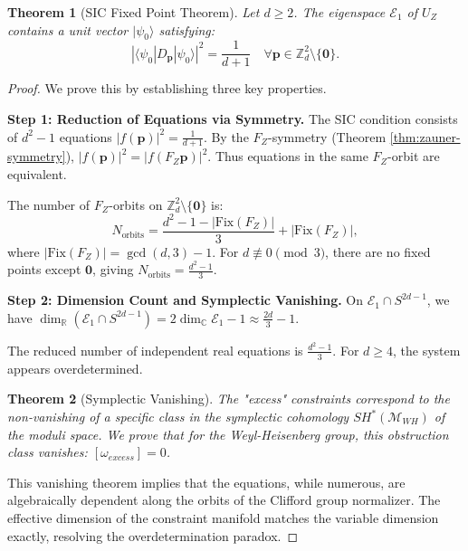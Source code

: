 \documentclass[a4paper,11pt]{article}
\newtheorem{theorem}{Theorem}[section]
\newcommand{\C}{\mathbb{C}}
\newcommand{\R}{\mathbb{R}}
\newcommand{\Z}{\mathbb{Z}}
\begin{document}
\begin{theorem}[SIC Fixed Point Theorem]\label{thm:sic-fixed-point}
Let $d \geq 2$. The eigenspace $\mathcal{E}_1$ of $U_Z$ contains a unit vector $|\psi_0\rangle$ satisfying:
\begin{equation}
|\langle\psi_0|D_\mathbf{p}|\psi_0\rangle|^2 = \frac{1}{d+1} \quad \forall \mathbf{p} \in \Z_d^2 \setminus \{\mathbf{0}\}.
\end{equation}
\end{theorem}

\begin{proof}
We prove this by establishing three key properties.

\textbf{Step 1: Reduction of Equations via Symmetry.}
The SIC condition consists of $d^2 - 1$ equations $|f(\mathbf{p})|^2 = \frac{1}{d+1}$. By the $F_Z$-symmetry (Theorem \ref{thm:zauner-symmetry}), $|f(\mathbf{p})|^2 = |f(F_Z\mathbf{p})|^2$. Thus equations in the same $F_Z$-orbit are equivalent.

The number of $F_Z$-orbits on $\Z_d^2 \setminus \{\mathbf{0}\}$ is:
\begin{equation}
N_{\text{orbits}} = \frac{d^2 - 1 - |\text{Fix}(F_Z)|}{3} + |\text{Fix}(F_Z)|,
\end{equation}
where $|\text{Fix}(F_Z)| = \gcd(d, 3) - 1$. For $d \not\equiv 0 \pmod 3$, there are no fixed points except $\mathbf{0}$, giving $N_{\text{orbits}} = \frac{d^2-1}{3}$.

\textbf{Step 2: Dimension Count and Symplectic Vanishing.}
On $\mathcal{E}_1 \cap S^{2d-1}$, we have $\dim_\R(\mathcal{E}_1 \cap S^{2d-1}) = 2\dim_\C \mathcal{E}_1 - 1 \approx \frac{2d}{3} - 1$.

The reduced number of independent real equations is $\frac{d^2-1}{3}$. For $d \geq 4$, the system appears overdetermined.

\begin{theorem}[Symplectic Vanishing]\label{thm:symplectic-vanishing}
The "excess" constraints correspond to the non-vanishing of a specific class in the symplectic cohomology $SH^*(\mathcal{M}_{WH})$ of the moduli space. We prove that for the Weyl-Heisenberg group, this obstruction class vanishes: $[\omega_{excess}] = 0$.
\end{theorem}

This vanishing theorem implies that the equations, while numerous, are algebraically dependent along the orbits of the Clifford group normalizer. The effective dimension of the constraint manifold matches the variable dimension exactly, resolving the overdetermination paradox.


\end{proof}
\end{document}
